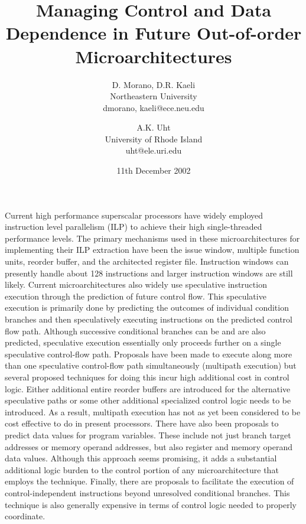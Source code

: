 \documentclass[10pt,dvips]{article}
\begin{document}
%
%
%
\title{Managing Control and Data Dependence in Future Out-of-order
Microarchitectures}
%
\author{
D. Morano, D.R. Kaeli\\
Northeastern University\\
{dmorano, kaeli}@ece.neu.edu\\
\and
A.K. Uht\\
University of Rhode Island\\ 
uht@ele.uri.edu
}
%
%
\date{11th December 2002}
%
\maketitle
%
%
%
%
%
Current high performance superscalar processors have widely employed
instruction level parallelism (ILP) to achieve their high single-threaded
performance levels.
The primary mechanisms used in these microarchitectures for implementing
their ILP extraction have been the issue window,
multiple function units, 
reorder buffer,
and the architected register file.
Instruction windows can presently handle about 128 instructions
and larger instruction windows are still likely.
Current microarchitectures also widely use speculative instruction
execution through the prediction of future control flow.
This speculative execution is primarily done by predicting the outcomes
of individual condition branches and then speculatively executing instructions
on the predicted control flow path.  Although successive conditional
branches can be and are also predicted, speculative execution essentially only
proceeds further on a single speculative control-flow path.
Proposals have been made to execute along more than one speculative
control-flow path simultaneously (multipath execution)
but several proposed techniques for doing this incur
high additional cost in control logic.
Either additional entire reorder buffers are introduced for the alternative
speculative paths or some other additional specialized control logic
needs to be introduced.
As a result, multipath execution has not as yet been considered to be cost 
effective to do in present processors.
There have also been proposals to predict data values for program
variables.  These include not just branch target addresses or memory operand
addresses, but also register and memory operand data values.
Although this approach seems promising, it adds a substantial additional 
logic
burden to the control portion of any microarchitecture that employs
the technique.
Finally, there are proposals to facilitate the execution of
control-independent instructions beyond unresolved conditional branches.
This technique is also generally expensive in terms of control logic
needed to properly coordinate.
\end{document}
